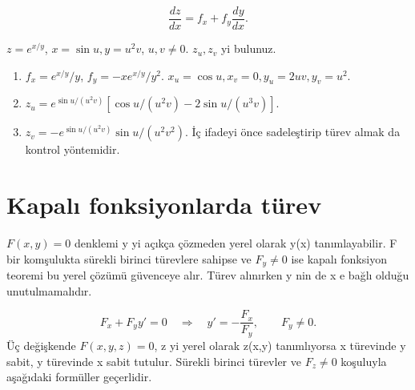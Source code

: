 {\small\[
\frac{dz}{dx}=f_x+f_y\frac{dy}{dx}.
\]}
\begin{tcolorbox}[title={Örnek 6.5 | İki bağımsız yeni değişkenle karmaşık örnek},colframe=accent]\(z=e^{x/y}\), \(x=\sin u,y=u^2v\), \(u,v\ne0\). \(z_u,z_v\) yi bulunuz.
\par{}\end{tcolorbox}
\begin{tcolorbox}[title={Adım adım çözüm},colback=green!3!white,colframe=green]\begin{enumerate}
\item \(f_x=e^{x/y}/y\), \(f_y=-xe^{x/y}/y^2\). \(x_u=\cos u,x_v=0,y_u=2uv,y_v=u^2\).
\item \(z_u=e^{\sin u/(u^2v)}[\cos u/(u^2v)-2\sin u/(u^3v)]\).
\item \(z_v=-e^{\sin u/(u^2v)}\sin u/(u^2v^2)\). İç ifadeyi önce sadeleştirip türev almak da kontrol yöntemidir.
\end{enumerate}\end{tcolorbox}
\section{Kapalı fonksiyonlarda türev}
\(F(x,y)=0\) denklemi y yi açıkça çözmeden yerel olarak y(x) tanımlayabilir. F bir komşulukta sürekli birinci türevlere sahipse ve \(F_y\ne0\) ise kapalı fonksiyon teoremi bu yerel çözümü güvenceye alır. Türev alınırken y nin de x e bağlı olduğu unutulmamalıdır.


{\small\[
F_x+F_yy\prime=0\quad\Longrightarrow\quad y\prime=-\frac{F_x}{F_y},\qquad F_y\ne0.
\]}
Üç değişkende \(F(x,y,z)=0\), z yi yerel olarak z(x,y) tanımlıyorsa x türevinde y sabit, y türevinde x sabit tutulur. Sürekli birinci türevler ve \(F_z\ne0\) koşuluyla aşağıdaki formüller geçerlidir.


